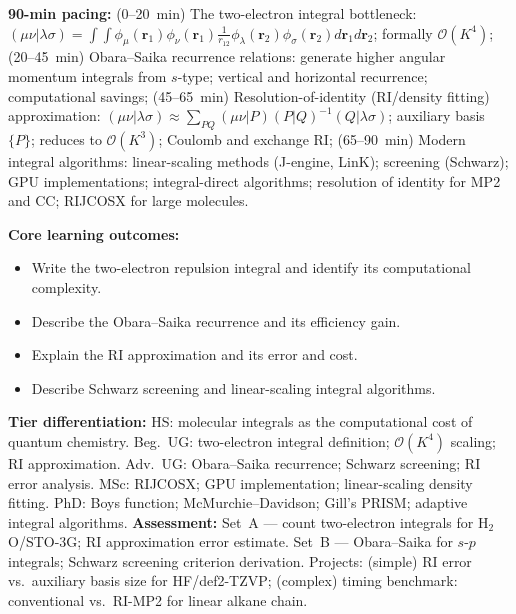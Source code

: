 \documentclass[11pt,a4paper]{article}
\begin{document}
\begin{tcolorbox}[chembox, title={Module~III.2 / L15: Molecular Integral Schemes}]
\textbf{90-min pacing:} (0--20~min) The two-electron integral bottleneck: $(\mu\nu|\lambda\sigma)=\int\int\phi_\mu(\mathbf{r}_1)\phi_\nu(\mathbf{r}_1)\tfrac{1}{r_{12}}\phi_\lambda(\mathbf{r}_2)\phi_\sigma(\mathbf{r}_2)d\mathbf{r}_1d\mathbf{r}_2$; formally $\mathcal{O}(K^4)$; (20--45~min) Obara--Saika recurrence relations: generate higher angular momentum integrals from $s$-type; vertical and horizontal recurrence; computational savings; (45--65~min) Resolution-of-identity (RI/density fitting) approximation: $(\mu\nu|\lambda\sigma)\approx\sum_{PQ}(\mu\nu|P)(P|Q)^{-1}(Q|\lambda\sigma)$; auxiliary basis $\{P\}$; reduces to $\mathcal{O}(K^3)$; Coulomb and exchange RI; (65--90~min) Modern integral algorithms: linear-scaling methods (J-engine, LinK); screening (Schwarz); GPU implementations; integral-direct algorithms; resolution of identity for MP2 and CC; RIJCOSX for large molecules.

\medskip\textbf{Core learning outcomes:}
\begin{itemize}[leftmargin=1.4em,topsep=2pt,itemsep=1pt]
  \item Write the two-electron repulsion integral and identify its computational complexity.
  \item Describe the Obara--Saika recurrence and its efficiency gain.
  \item Explain the RI approximation and its error and cost.
  \item Describe Schwarz screening and linear-scaling integral algorithms.
\end{itemize}
\medskip\textbf{Tier differentiation:}
HS: molecular integrals as the computational cost of quantum chemistry.
Beg.\ UG: two-electron integral definition; $\mathcal{O}(K^4)$ scaling; RI approximation.
Adv.\ UG: Obara--Saika recurrence; Schwarz screening; RI error analysis.
MSc: RIJCOSX; GPU implementation; linear-scaling density fitting.
PhD: Boys function; McMurchie--Davidson; Gill's PRISM; adaptive integral algorithms.
\medskip\textbf{Assessment:}
Set~A --- count two-electron integrals for H$_2$O/STO-3G; RI approximation error estimate.
Set~B --- Obara--Saika for $s$-$p$ integrals; Schwarz screening criterion derivation.
Projects: (simple) RI error vs.\ auxiliary basis size for HF/def2-TZVP; (complex) timing benchmark: conventional vs.\ RI-MP2 for linear alkane chain.
\end{tcolorbox}

\medskip
\end{document}
